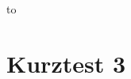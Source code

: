 %
%
%




{\parindent0pt\hbox to}
\vspace{0.5cm}

\section*{Kurztest 3}

\begin{uebungsaufgaben}



\end{uebungsaufgaben}


